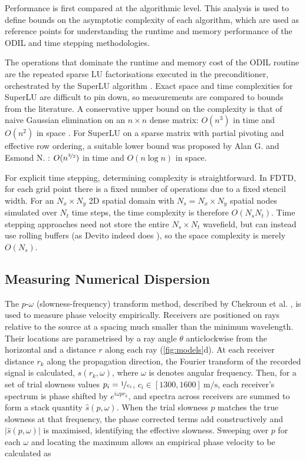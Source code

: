 \documentclass[final-report]{report-template}
\begin{document}
Performance is first compared at the algorithmic level. This analysis is used to define bounds on the asymptotic complexity of each algorithm, which are used as reference points for understanding the runtime and memory performance of the ODIL and time stepping methodologies. 

The operations that dominate the runtime and memory cost of the ODIL routine are the repeated sparse LU factorisations executed in the preconditioner, orchestrated by the SuperLU algorithm \cite{Demmel:CSD-97-944}. Exact space and time complexities for SuperLU are difficult to pin down, so measurements are compared to bounds from the literature. A conservative upper bound on the complexity is that of naive Gaussian elimination on an $n\times n$ dense matrix: $O(n^3)$ in time and $O(n^2)$ in space \cite{liOverviewSuperLUAlgorithms2005}. For SuperLU on a sparse matrix with partial pivoting and effective row ordering, a suitable lower bound was proposed by Alan G. and Esmond N. \cite{doi:10.1137/0909057}: $O(n^{\nicefrac{3}{2}})$ in time and $O(n\log n)$ in space.   

For explicit time stepping, determining complexity is straightforward. In FDTD, for each grid point there is a fixed number of operations due to a fixed stencil width. For an $N_x \times N_y$ 2D spatial domain with $N_s = N_x \times N_y$ spatial nodes simulated over $N_t$ time steps, the time complexity is therefore $O(N_sN_t)$. Time stepping approaches need not store the entire $N_s \times N_t$ wavefield, but can instead use rolling buffers (as Devito indeed does \cite{louboutinDevitoV310Embedded2019}), so the space complexity is merely $O(N_s)$.

\subsection{Measuring Numerical Dispersion}
\label{subsect:wave_specifics}

The $p$-$\omega$ (slowness-frequency) transform method, described by Chekroun et al. \cite{chekrounTimedomainNumericalSimulations2012}, is used to measure phase velocity empirically. Receivers are positioned on rays relative to the source at a spacing much smaller than the minimum wavelength. Their locations are parametrised by a ray angle $\theta$ anticlockwise from the horizontal and a distance $r$ along each ray (\ref{fig:models}d). At each receiver distance $r_k$ along the propagation direction, the Fourier transform of the recorded signal is calculated, $s(r_k, \omega)$, where $\omega$ is denotes angular frequency. Then, for a set of trial slowness values $p_i = \nicefrac{1}{c_i}$, $c_i \in [1300, 1600]\ \si{\metre\per\second}$, each receiver's spectrum is phase shifted by $e^{i\omega p r_k}$, and spectra across receivers are summed to form a stack quantity $\hat{s}(p, \omega)$. When the trial slowness $p$ matches the true slowness at that frequency, the phase corrected terms add constructively and $|\hat{s}(p, \omega)|$ is maximised, identifying the effective slowness. Sweeping over $p$ for each $\omega$ and locating the maximum allows an empirical phase velocity to be calculated as
\end{document}
